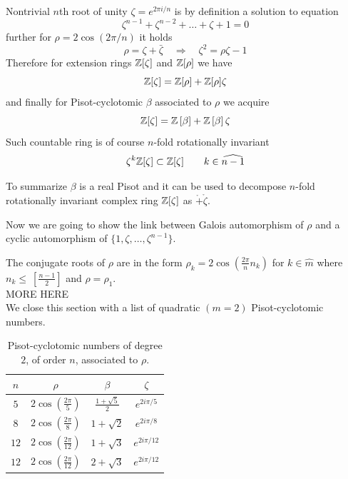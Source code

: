 \documentclass[text.tex]{subfiles}
\begin{document}
Nontrivial $n$th root of unity $\zeta = e^{2\pi i/n}$ is by definition a solution to equation
$$\zeta^{n-1}+\zeta^{n-2}+\dots+\zeta+1 = 0$$
further for $\rho = 2\cos\left(2\pi/n\right)$ it holds
$$\rho = \zeta + \bar{\zeta}\quad\Rightarrow\quad \zeta^2 = \rho\zeta - 1$$
Therefore for extension rings $\mathbb{Z}[\zeta]$ and $\mathbb{Z}[\rho]$ we have
$$\mathbb{Z}[\zeta] = \mathbb{Z}[\rho] + \mathbb{Z}[\rho]\zeta$$
and finally for Pisot-cyclotomic $\beta$ associated to $\rho$ we acquire
$$\mathbb{Z}[\zeta] = \mathbb{Z}\left[\beta\right] + \mathbb{Z}\left[\beta\right]\zeta$$
Such countable ring is of course $n$-fold rotationally invariant
$$\zeta^k\mathbb{Z}[\zeta] \subset \mathbb{Z}[\zeta]\qquad k\in\widehat{n-1}$$

To summarize $\beta$ is a real Pisot and it can be used to decompose $n$-fold rotationally invariant complex ring $\mathbb{Z}[\zeta]$ as $\ring + \ring\zeta$. 

Now we are going to show the link between Galois automorphism of $\rho$ and a cyclic automorphism of $\{1, \zeta, \dots, \zeta^{n-1}\}$.

The conjugate roots of $\rho$ are in the form $\rho_k = 2\cos\left(\frac{2\pi}{n}n_k\right)$ for $k\in \widehat{m}$ where $n_k\leq~\left[\frac{n-1}{2}\right]$ and  $\rho = \rho_1$.
\\[2cm]
{\Huge MORE HERE}
\\[2cm]


We close this section with a list of quadratic $(m=2)$ Pisot-cyclotomic numbers. 

\begin{table}[h!]
\centering
\begin{tabular}{cccc}
$n$ & $\rho$ & $\beta$ & $\zeta$ \\
\hline
$5$   & $2 \cos\left(\frac{2\pi}{5}\right)$   & $\frac{1+\sqrt{5}}{2} $    & $e^{2i\pi/5}$ \\
$8$   & $2 \cos\left(\frac{2\pi}{8}\right)$   & $ 1+\sqrt{2} $      & $e^{2i\pi/8}$ \\
$12$  & $2 \cos\left(\frac{2\pi}{12}\right)$  & $ 1+\sqrt{3} $     & $e^{2i\pi/12}$ \\
$12$  & $2 \cos\left(\frac{2\pi}{12}\right)$  & $ 2+\sqrt{3} $                & $e^{2i\pi/12}$ \\
\end{tabular}
\caption{Pisot-cyclotomic numbers of degree $2$, of order $n$, associated to $\rho$.}
\label{tab_quadraticPisotCyclotomic}
\end{table}
\end{document}
